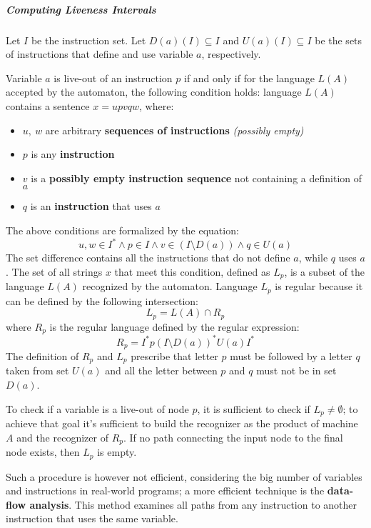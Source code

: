 \documentclass[english]{article}
\begin{document}
\subparagraph*{Computing Liveness Intervals}

Let \(I\) be the instruction set.
Let \(D(a)(I) \subseteq I\) and \(U(a)(I) \subseteq I\) be the sets of instructions that define and use variable \(a\), respectively.

Variable \(a\) is live-out of an instruction \(p\) if and only if for the language \(L(A)\) accepted by the automaton, the following condition holds:
language \(L(A)\) contains a sentence \(x = u p v q w\), where:

\begin{itemize}
  \item \(u, \ w\) are arbitrary \textbf{sequences of instructions} \textit{(possibly empty)}
  \item \(p\) is any \textbf{instruction}
  \item \(v\) is a \textbf{possibly empty instruction sequence} not containing a definition of \(a\)
  \item \(q\) is an \textbf{instruction} that uses \(a\)
\end{itemize}

The above conditions are formalized by the equation:
\[ u, w \in I^\ast \land p \in I \land v \in \left( I \setminus D\left( a \right) \right) \land q \in U\left( a \right) \]
The set difference contains all the instructions that do not define \(a\), while \(q\) uses \(a\).
The set of all strings \(x\) that meet this condition, defined as \(L_p\), is a subset of the language \(L(A)\) recognized by the automaton.
Language \(L_p\) is regular because it can be defined by the following intersection:
\[ L_p = L(A) \cap R_p \]
where \(R_p\) is the regular language defined by the regular expression:
\[ R_p = I^\ast p \left( I \setminus D \left( a \right) \right)^\ast U \left( a \right) I^\ast \]
The definition of \(R_p\) and \(L_p\) prescribe that letter \(p\) must be followed by a letter \(q\) taken from set \(U\left( a \right)\)  and all the letter between \(p\) and \(q\) must not be in set \(D\left( a \right)\).

To check if a variable is a live-out of node \(p\), it is sufficient to check if \(L_p \neq \emptyset\);
to achieve that goal it's sufficient to build the recognizer as the product of machine \(A\) and the recognizer of \(R_p\).
If no path connecting the input node to the final node exists, then \(L_p\) is empty.

Such a procedure is however not efficient, considering the big number of variables and instructions in real-world programs;
a more efficient technique is the \textbf{data-flow analysis}.
This method examines all paths from any instruction to another instruction that uses the same variable.
\end{document}
